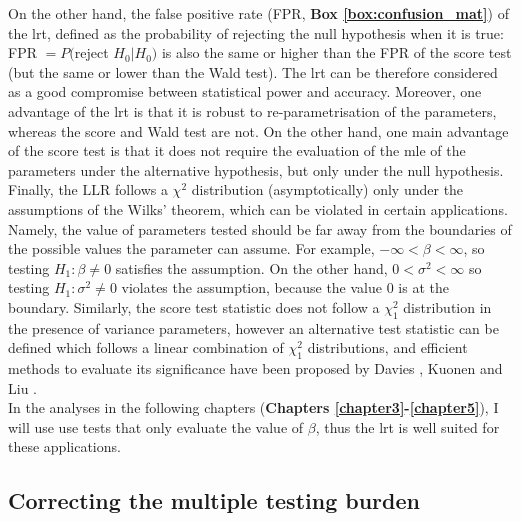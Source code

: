 On the other hand, the false positive rate (FPR, \textbf{Box \ref{box:confusion_mat}}) of the \gls{lrt}, defined as the probability of rejecting the null hypothesis when it is true: FPR $= P($reject $H_0 | H_0)$ is also the same or higher than the FPR of the score test (but the same or lower than the Wald test).
The \gls{lrt} can be therefore considered as a good compromise between statistical power and accuracy.
Moreover, one advantage of the \gls{lrt} is that it is robust to re-parametrisation of the parameters, whereas the score and Wald test are not. 
On the other hand, one main 
advantage of the score test is that it does not require the evaluation of the \gls{mle} of the parameters under the alternative hypothesis, but only under the null hypothesis.
Finally, the $\mathrm{LLR}$ follows a $\chi^2$ distribution (asymptotically) only under the assumptions of the Wilks' theorem, which can be violated in certain applications.
Namely, the value of parameters tested should be far away from the boundaries of the possible values the parameter can assume.
For example, $-\infty < \beta < \infty$, so testing $H_1: \beta \neq 0$ satisfies the assumption.
On the other hand, $0 < \sigma^2 < \infty$ so testing $H_1: \sigma^2 \neq 0$ violates the assumption, because the value $0$ is at the boundary.
Similarly, the score test statistic does not follow a $\chi^2_1$ distribution in the presence of variance parameters, however an alternative test statistic can be defined which follows a linear combination of $\chi^2_1$ distributions, and efficient methods to evaluate its significance have been proposed by Davies \cite{davies1980algorithm}, Kuonen \cite{kuonen1999miscellanea} and Liu \cite{liu2009new, lee2012optimal}. \\

In the analyses in the following chapters (\textbf{Chapters \ref{chapter3}-\ref{chapter5}}), I will use use tests that only evaluate the value of $\beta$, thus the \gls{lrt} is well suited for these applications.


\subsection{Correcting the multiple testing burden}
\label{sec:multiple_testing}

